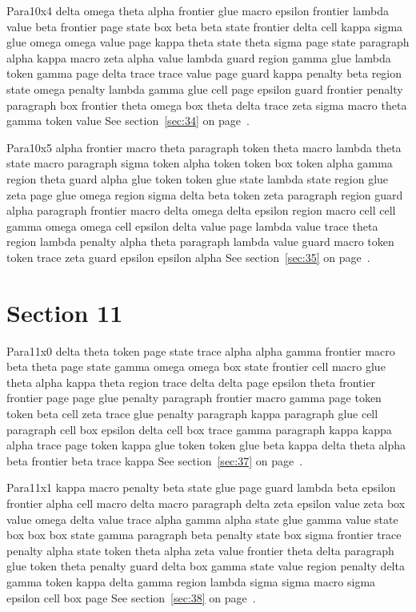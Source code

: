 \documentclass{article}
\begin{document}
Para10x4 delta omega theta alpha frontier glue macro epsilon frontier lambda value beta frontier page state box beta beta state frontier delta cell kappa sigma glue omega omega value page kappa theta state theta sigma page state paragraph alpha kappa macro zeta alpha value lambda guard region gamma glue lambda token gamma page delta trace trace value page guard kappa penalty beta region state omega penalty lambda gamma glue cell page epsilon guard frontier penalty paragraph box frontier theta omega box theta delta trace zeta sigma macro theta gamma token value See section~\ref{sec:34} on page~\pageref{sec:34}.

Para10x5 alpha frontier macro theta paragraph token theta macro lambda theta state macro paragraph sigma token alpha token token box token alpha gamma region theta guard alpha glue token token glue state lambda state region glue zeta page glue omega region sigma delta beta token zeta paragraph region guard alpha paragraph frontier macro delta omega delta epsilon region macro cell cell gamma omega omega cell epsilon delta value page lambda value trace theta region lambda penalty alpha theta paragraph lambda value guard macro token token trace zeta guard epsilon epsilon alpha See section~\ref{sec:35} on page~\pageref{sec:35}.

\section{Section 11}\label{sec:11}
Para11x0 delta theta token page state trace alpha alpha gamma frontier macro beta theta page state gamma omega omega box state frontier cell macro glue theta alpha kappa theta region trace delta delta page epsilon theta frontier frontier page page glue penalty paragraph frontier macro gamma page token token beta cell zeta trace glue penalty paragraph kappa paragraph glue cell paragraph cell box epsilon delta cell box trace gamma paragraph kappa kappa alpha trace page token kappa glue token token glue beta kappa delta theta alpha beta frontier beta trace kappa See section~\ref{sec:37} on page~\pageref{sec:33}.

Para11x1 kappa macro penalty beta state glue page guard lambda beta epsilon frontier alpha cell macro delta macro paragraph delta zeta epsilon value zeta box value omega delta value trace alpha gamma alpha state glue gamma value state box box box state gamma paragraph beta penalty state box sigma frontier trace penalty alpha state token theta alpha zeta value frontier theta delta paragraph glue token theta penalty guard delta box gamma state value region penalty delta gamma token kappa delta gamma region lambda sigma sigma macro sigma epsilon cell box page See section~\ref{sec:38} on page~\pageref{sec:34}.
\end{document}
